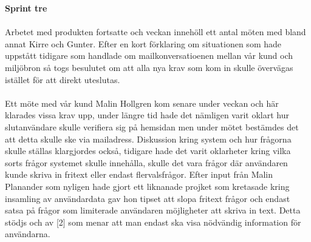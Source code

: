 \documentclass[12pt]{article}
\begin{document}
\textbf{Sprint tre} \\\\
Arbetet med produkten fortsatte och veckan innehöll ett antal möten med bland annat Kirre och Gunter. Efter en kort förklaring om situationen som hade uppstått tidigare som handlade om mailkonversatioenen mellan vår kund och miljöbron så togs besulutet om att alla nya krav som kom in skulle övervägas istället för att direkt uteslutas. \\\\
Ett möte med vår kund Malin Hollgren kom senare under veckan och här klarades vissa krav upp, under längre tid hade det nämligen varit oklart hur slutanvändare skulle verifiera sig på hemsidan men under mötet bestämdes det att detta skulle ske via mailadress. Diskussion kring system och hur frågorna skulle ställas klargjordes också, tidigare hade det varit oklarheter kring vilka sorts frågor systemet skulle innehålla, skulle det vara frågor där användaren kunde skriva in fritext eller endast flervalsfrågor. Efter input från Malin Planander som nyligen hade gjort ett liknanade projket som kretasade kring insamling av användardata gav hon tipset att slopa fritext frågor och endast satsa på frågor som limiterade användaren möjligheter att skriva in text. Detta stödjs och av [2] som menar att man endast ska visa nödvändig information för användarna.  
\end{document}
